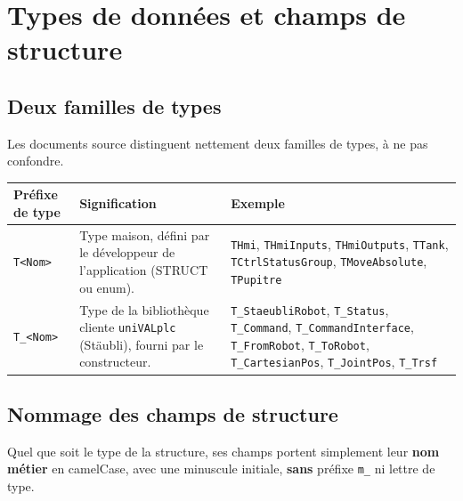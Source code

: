 \section{Types de données et champs de structure}
\label{secTypesDonnees}

\subsection{Deux familles de types}

Les documents source distinguent nettement deux familles de types, à ne pas confondre.

\begin{center}
    \begin{tabular}{|p{2.8cm}|p{6.5cm}|p{5cm}|}
        \hline
        \textbf{Préfixe de type} & \textbf{Signification} & \textbf{Exemple} \\
        \hline
        \texttt{T<Nom>} & Type maison, défini par le développeur de l'application (STRUCT ou enum). & \texttt{THmi}, \texttt{THmiInputs}, \texttt{THmiOutputs}, \texttt{TTank}, \texttt{TCtrlStatusGroup}, \texttt{TMoveAbsolute}, \texttt{TPupitre} \\
        \hline
        \texttt{T\_<Nom>} & Type de la bibliothèque cliente \texttt{uniVALplc} (Stäubli), fourni par le constructeur. & \texttt{T\_StaeubliRobot}, \texttt{T\_Status}, \texttt{T\_Command}, \texttt{T\_CommandInterface}, \texttt{T\_FromRobot}, \texttt{T\_ToRobot}, \texttt{T\_CartesianPos}, \texttt{T\_JointPos}, \texttt{T\_Trsf} \\
        \hline
    \end{tabular}
\end{center}

\subsection{Nommage des champs de structure}

Quel que soit le type de la structure, ses champs portent simplement leur \textbf{nom métier} en
camelCase, avec une minuscule initiale, \textbf{sans} préfixe \texttt{m\_} ni lettre de type.

